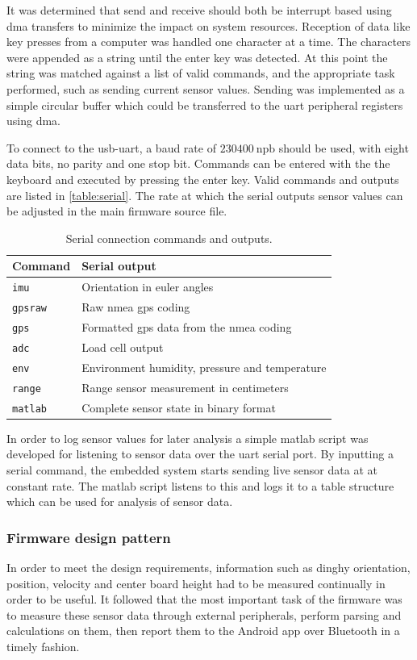 It was determined that send and receive should both be interrupt based using \gls{dma} transfers to minimize the impact on system resources. Reception of data like key presses from a computer was handled one character at a time. The characters were appended as a string until the enter key was detected. At this point the string was matched against a list of valid commands, and the appropriate task performed, such as sending current sensor values. Sending was implemented as a simple circular buffer which could be transferred to the \gls{uart} peripheral registers using \gls{dma}.

To connect to the \gls{usb}-\gls{uart}, a baud rate of $230400~\textrm{npb}$ should be used, with eight data bits, no parity and one stop bit. Commands can be entered with the the keyboard and executed by pressing the enter key. Valid commands and outputs are listed in \autoref{table:serial}. The rate at which the serial outputs sensor values can be adjusted in the main firmware source file.
\begin{table}[H]
\centering
\begin{tabular}{ l | l }
 	Command 		& Serial output \\
  	\hline
  	\texttt{imu} 		& Orientation in euler angles \\
  	\texttt{gpsraw} 	& Raw \gls{nmea} \gls{gps} coding\\
  	\texttt{gps} 		& Formatted \gls{gps} data from the \gls{nmea} coding\\
  	\texttt{adc} 		& Load cell output\\
  	\texttt{env} 		& Environment humidity, pressure and temperature \\
  	\texttt{range} 	& Range sensor measurement in centimeters \\
  	\texttt{matlab} 	& Complete sensor state in binary format \\
\end{tabular}
\caption{Serial connection commands and outputs.}
\label{table:serial}
\end{table}

In order to log sensor values for later analysis a simple \gls{matlab} script was developed for listening to sensor data over the \gls{uart} serial port. By inputting a serial command, the embedded system starts sending live sensor data at at constant rate. The \gls{matlab} script listens to this and logs it to a table structure which can be used for analysis of sensor data.

\subsubsection{Firmware design pattern}
In order to meet the design requirements, information such as dinghy orientation, position, velocity and center board height had to be measured continually in order to be useful. It followed that the most important task of the firmware was to measure these sensor data through external peripherals, perform parsing and calculations on them, then report them to the Android app over Bluetooth in a timely fashion. 

